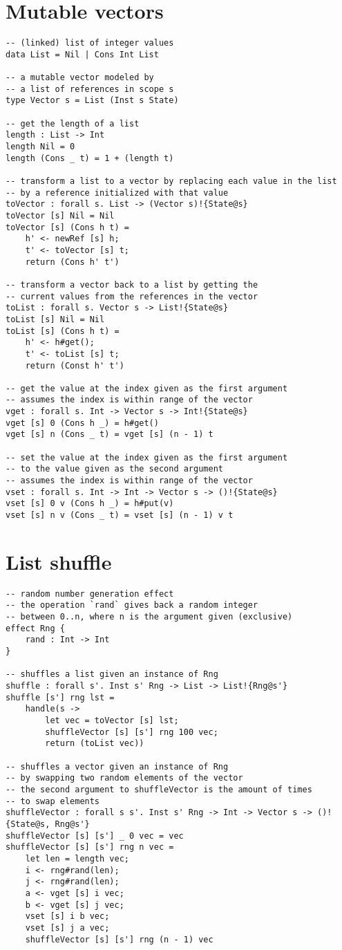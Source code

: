 \section{Mutable vectors}
\begin{verbatim}
-- (linked) list of integer values
data List = Nil | Cons Int List

-- a mutable vector modeled by
-- a list of references in scope s
type Vector s = List (Inst s State)

-- get the length of a list
length : List -> Int
length Nil = 0
length (Cons _ t) = 1 + (length t)

-- transform a list to a vector by replacing each value in the list
-- by a reference initialized with that value
toVector : forall s. List -> (Vector s)!{State@s}
toVector [s] Nil = Nil
toVector [s] (Cons h t) =
	h' <- newRef [s] h;
	t' <- toVector [s] t;
	return (Cons h' t')

-- transform a vector back to a list by getting the
-- current values from the references in the vector
toList : forall s. Vector s -> List!{State@s}
toList [s] Nil = Nil
toList [s] (Cons h t) =
	h' <- h#get();
	t' <- toList [s] t;
	return (Const h' t')

-- get the value at the index given as the first argument
-- assumes the index is within range of the vector
vget : forall s. Int -> Vector s -> Int!{State@s}
vget [s] 0 (Cons h _) = h#get()
vget [s] n (Cons _ t) = vget [s] (n - 1) t

-- set the value at the index given as the first argument
-- to the value given as the second argument
-- assumes the index is within range of the vector
vset : forall s. Int -> Int -> Vector s -> ()!{State@s}
vset [s] 0 v (Cons h _) = h#put(v)
vset [s] n v (Cons _ t) = vset [s] (n - 1) v t
\end{verbatim}

\section{List shuffle}
\begin{verbatim}
-- random number generation effect
-- the operation `rand` gives back a random integer
-- between 0..n, where n is the argument given (exclusive)
effect Rng {
	rand : Int -> Int
}

-- shuffles a list given an instance of Rng
shuffle : forall s'. Inst s' Rng -> List -> List!{Rng@s'}
shuffle [s'] rng lst =
	handle(s ->
		let vec = toVector [s] lst;
		shuffleVector [s] [s'] rng 100 vec;
		return (toList vec))

-- shuffles a vector given an instance of Rng
-- by swapping two random elements of the vector
-- the second argument to shuffleVector is the amount of times
-- to swap elements
shuffleVector : forall s s'. Inst s' Rng -> Int -> Vector s -> ()!{State@s, Rng@s'}
shuffleVector [s] [s'] _ 0 vec = vec
shuffleVector [s] [s'] rng n vec =
	let len = length vec;
	i <- rng#rand(len);
	j <- rng#rand(len);
	a <- vget [s] i vec;
	b <- vget [s] j vec;
	vset [s] i b vec;
	vset [s] j a vec;
	shuffleVector [s] [s'] rng (n - 1) vec
\end{verbatim}

